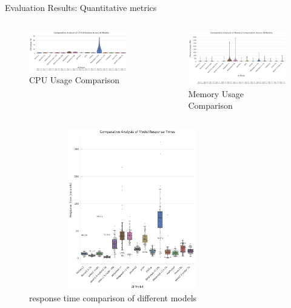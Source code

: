 \documentclass{beamer}
\begin{document}
\begin{frame}{Evaluation Results: Quantitative metrics}
  \begin{columns}[t]
      \begin{figure}
        \centering
        \includegraphics[width=0.9\columnwidth]{model_cpu_usage_comparison.png}
        \caption{CPU Usage Comparison}
        \label{fig:cpu-usage}
      \end{figure}
      \begin{figure}
        \centering
        \includegraphics[width=0.9\columnwidth]{model_memory_usage_comparison.png}
        \caption{Memory Usage Comparison}
        \label{fig:memory-usage}
      \end{figure}
  \end{columns}
\end{frame}

\begin{frame}
  \begin{figure}
    \centering
    \caption{response time comparison of different models}
    \label{fig:latency-comparison}
    \includegraphics[width=0.8\textwidth, height=7cm, keepaspectratio]{model_response_times_comparison.png}
  \end{figure}
\end{frame}
\end{document}
